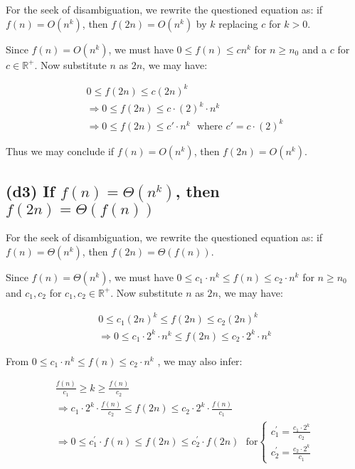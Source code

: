 \documentclass[12pt]{article}
\begin{document}
For the seek of disambiguation, we rewrite the questioned equation as: if $f(n) = O(n^k)$, then $f(2n) = O(n^k)$ by $k$ replacing $c$ for $k > 0$.


Since $f(n) = O(n^k)$, we must have $0 \leq f(n) \leq cn^k$ for $n \geq n_0$ and a $c$ for $c \in \mathbb{R^+}$. Now substitute $n$ as $2n$, we may have:

\begin{gather}
    0 \leq f(2n) \leq c(2n)^k \nonumber \\
    \Rightarrow 0 \leq f(2n) \leq c\cdot (2)^k \cdot n^k \\
    \Rightarrow 0 \leq f(2n) \leq c' \cdot n^k \ \ \ \text{where $c' = c\cdot (2)^k$}
\end{gather}

Thus we may conclude if $f(n) = O(n^k)$, then $f(2n) = O(n^k)$.

\subsection{(d3) If $f(n) = \Theta(n^k)$, then $f(2n) = \Theta(f(n))$}

For the seek of disambiguation, we rewrite the questioned equation as: if $f(n) = \Theta(n^k)$, then $f(2n) = \Theta(f(n))$.

Since $f(n) = \Theta(n^k)$, we must have $0 \leq c_1 \cdot n^k \leq f(n) \leq c_2 \cdot n^k$ for $n \geq n_0$ and $c_1, c_2$ for $c_1, c_2 \in \mathbb{R^+}$. Now substitute $n$ as $2n$, we may have:

\begin{gather}
    0 \leq c_1 (2n)^k \leq f(2n) \leq c_2 (2n)^k \nonumber \\
    \Rightarrow 0 \leq c_1 \cdot 2^k \cdot n^k \leq f(2n) \leq c_2 \cdot 2^k \cdot n^k
\end{gather}

From $0 \leq c_1 \cdot n^k \leq f(n) \leq c_2 \cdot n^k$ , we may also infer:

\begin{gather}
    \frac{f(n)}{c_1} \geq k \geq \frac{f(n)}{c_2} \\
    \Rightarrow c_1 \cdot 2^k \cdot \frac{f(n)}{c_2} \leq f(2n) \leq c_2 \cdot 2^k \cdot \frac{f(n)}{c_1} \\
    \Rightarrow 0\leq c^{'}_{1}\cdot f(n) \leq f(2n) \leq c^{'}_{2}\cdot f(2n) \ \ \ \text{for}\begin{cases}
                    c^{'}_{1} = \frac{c_1 \cdot 2^k}{c_2} \\
                    c^{'}_{2} = \frac{c_2 \cdot 2^k}{c_1}
                \end{cases}
\end{gather}
\end{document}
